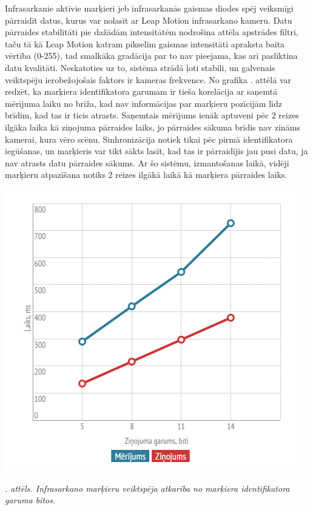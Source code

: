 \documentclass[12pt, a4paper, oneside, openright]{article}
\renewcommand{\thecimages}{\arabic{cimages}}
\begin{document}
\par
Infrasarkanie aktīvie marķieri jeb infrasarkanās gaismas diodes spēj veiksmīgi pārraidīt datus, kurus
var nolasīt ar Leap Motion infrasarkano kameru. Datu pārraides stabilitāti pie dažādām intensitātēm 
nodrošina attēla apstrādes filtri, taču tā kā 
Leap Motion katram pikselim gaismas intensitāti apraksta baita vērtība (0-255), tad smalkāka gradācija
par to nav pieejama, kas arī pasliktina datu kvalitāti.
Neskatoties uz to, sistēma strādā ļoti stabili, un galvenais veiktspēju ierobežojošais faktors ir kameras
frekvence. No grafika . attēlā var redzēt, ka marķiera identifikatora
garumam ir tieša korelācija ar saņemtā mērījuma laiku no brīža, kad nav informācijas par marķieru pozīcijām līdz brīdim, kad
tas ir ticis atrasts. Saņemtais mērījums ienāk aptuveni pēc 2 reizes ilgāka laika kā ziņojuma pārraides laiks,
jo pārraides sākuma brīdis nav zināms kamerai, kura vēro scēnu. Sinhronizācija notiek tikai pēc pirmā
identifikatora iegūšanas, un marķieris var tikt sākts lasīt, kad tas ir pārraidījis jau pusi datu, ja nav
atrasts datu pārraides sākums. Ar šo sistēmu, izmantošanas laikā, vidēji marķieru atpazīšana notiks 2 reizes
ilgākā laikā kā marķiera pārraides laiks.

\label{cimages:merijumi_garums_bitos.png}
\vspace{10pt}
\begin{samepage}
\begin{center}
\includegraphics[width=0.7\columnwidth]{images/merijumi_garums_bitos.png}
\begin{center}
\footnotesize{
\textit{\thecimages. attēls. Infrasarkano marķieru veiktspēja atkarība no marķiera identifikatora garuma bitos.}}
\end{center}
\end{center}
\end{samepage}
\end{document}
